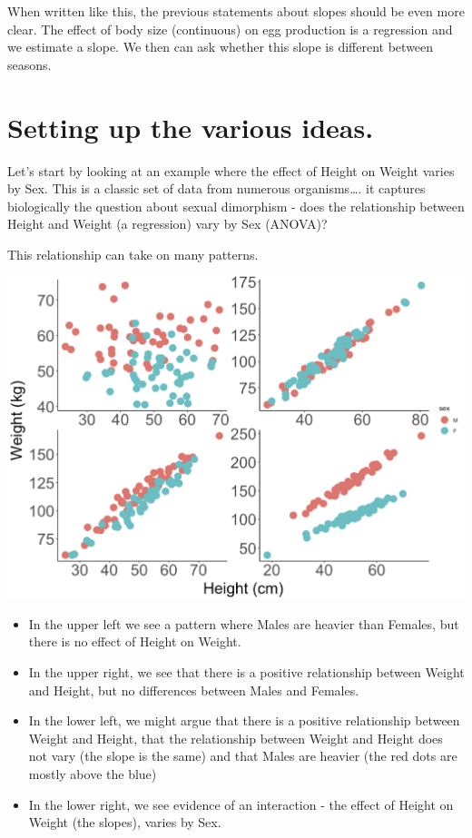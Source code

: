 \documentclass[
]{book}
\providecommand{\tightlist}{%
  \setlength{\itemsep}{0pt}\setlength{\parskip}{0pt}}
\begin{document}
When written like this, the previous statements about slopes should be even more clear. The effect of body size (continuous) on egg production is a regression and we estimate a slope. We then can ask whether this slope is different between seasons.

\hypertarget{setting-up-the-various-ideas.}{%
\section{Setting up the various ideas.}\label{setting-up-the-various-ideas.}}

Let's start by looking at an example where the effect of Height on Weight varies by Sex. This is a classic set of data from numerous organisms\ldots. it captures biologically the question about sexual dimorphism - does the relationship between Height and Weight (a regression) vary by Sex (ANOVA)?

This relationship can take on many patterns.

\includegraphics[width=17.89in]{images/ANCOVA_1}

\begin{itemize}
\tightlist
\item
  In the upper left we see a pattern where Males are heavier than Females, but there is no effect of Height on Weight.
\item
  In the upper right, we see that there is a positive relationship between Weight and Height, but no differences between Males and Females.
\item
  In the lower left, we might argue that there is a positive relationship between Weight and Height, that the relationship between Weight and Height does not vary (the slope is the same) and that Males are heavier (the red dots are mostly above the blue)
\item
  In the lower right, we see evidence of an interaction - the effect of Height on Weight (the slopes), varies by Sex.
\end{itemize}
\end{document}
